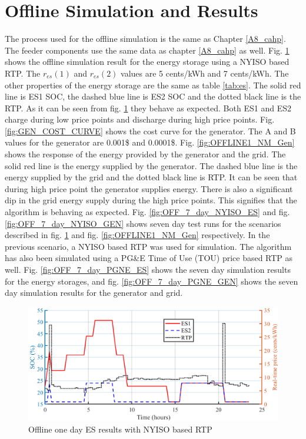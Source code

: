 \section{Offline Simulation and Results}
The process used for the offline simulation is the same as Chapter \ref{A8_cahp}. The feeder components use the same data as chapter \ref{A8_cahp} as well. Fig. \ref{fig:OFFLINE1_NM_ES} shows the offline simulation result for the energy storage using a NYISO based RTP. The $r_{es}(1)$ and $r_{es}(2)$ values are 5 cents/kWh and 7 cents/kWh. The other properties of the energy storage are the same as table \ref{tab:es}. The solid red line is ES1 SOC, the dashed blue line is ES2 SOC and the dotted black line is the RTP.
As it can be seen from fig. \ref{fig:OFFLINE1_NM_ES} they behave as expected. Both ES1 and ES2 charge during low price points and discharge during high price points. Fig. \ref{fig:GEN_COST_CURVE} shows the cost curve for the generator. The A and B values for the generator are 0.001\$ and 0.0001\$. Fig. \ref{fig:OFFLINE1_NM_Gen} shows the response of the energy provided by the generator and the grid. The solid red line is the energy supplied by the generator. The dashed blue line is the energy supplied by the grid and the dotted black line is RTP. It can be seen that during high price point the generator supplies energy. There is also a significant dip in the grid energy supply during the high price points. This signifies that the algorithm is behaving as expected.
Fig. \ref{fig:OFF_7_day_NYISO_ES} and fig. \ref{fig:OFF_7_day_NYISO_GEN} shows seven day test runs for the scenarios described in fig. \ref{fig:OFFLINE1_NM_ES} and fig. \ref{fig:OFFLINE1_NM_Gen} respectively. In the previous scenario, a NYISO based RTP was used for simulation. The algorithm has also been simulated using a PG\&E Time of Use (TOU) price based RTP as well. Fig. \ref{fig:OFF_7_day_PGNE_ES} shows the seven day simulation results for the energy storages, and fig. \ref{fig:OFF_7_day_PGNE_GEN} shows the seven day simulation results for the generator and grid.
\begin{figure}[!ht]
\centering
\includegraphics[width = \linewidth]{figs/A82/OFFLINE1_NM_ES.png}
\caption{Offline one day ES results with NYISO based RTP}
\label{fig:OFFLINE1_NM_ES}
\end{figure}

